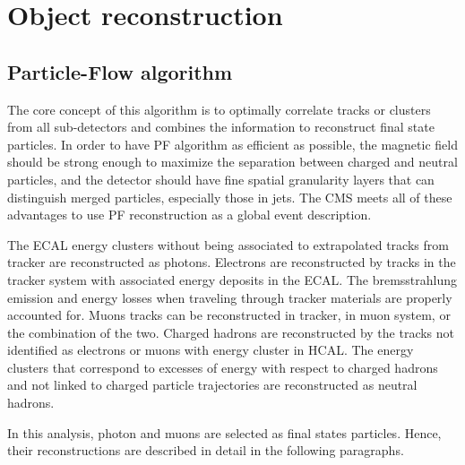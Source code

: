 \section{Object reconstruction}
	\subsection{Particle-Flow algorithm}
		The core concept of this algorithm is to optimally correlate tracks or clusters from all sub-detectors and combines the information to reconstruct final state particles. In order to have PF algorithm as efficient as possible, the magnetic field should be strong enough to maximize the separation between charged and neutral particles, and the detector should have fine spatial granularity layers that can distinguish merged particles, especially those in jets. The CMS meets all of these advantages to use PF reconstruction as a global event description. 

		The ECAL energy clusters without being associated to extrapolated tracks from tracker are reconstructed as photons. Electrons are reconstructed by tracks in the tracker system with associated energy deposits in the ECAL. The bremsstrahlung emission and energy losses when traveling through tracker materials are properly accounted for. Muons tracks can be reconstructed in tracker, in muon system, or the combination of the two. Charged hadrons are reconstructed by the tracks not identified as electrons or muons with energy cluster in HCAL. The energy clusters that correspond to excesses of energy with respect to charged hadrons and not linked to charged particle trajectories are reconstructed as neutral hadrons. 

		In this analysis, photon and muons are selected as final states particles. Hence, their reconstructions are described in detail in the following paragraphs.

